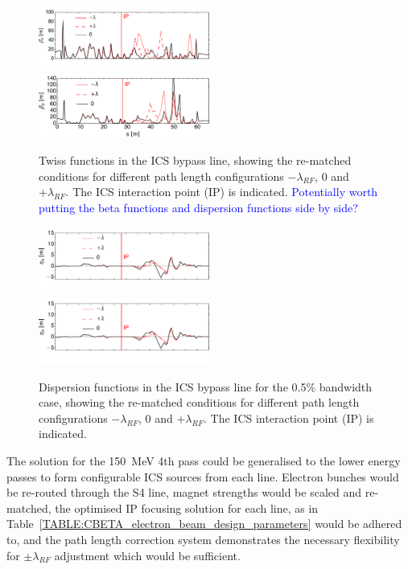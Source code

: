 \documentclass[../main.tex]{subfiles}
\begin{document}
\begin{figure}[!h]
    \centering
    \includegraphics[width=0.5\textwidth]{Figures/CBETA_Inverse_Compton_Source_Design/twissplotx.pdf}
    \includegraphics[width=0.5\textwidth]{Figures/CBETA_Inverse_Compton_Source_Design/twissploty.pdf}
    \caption{Twiss functions in the ICS bypass line, showing the re-matched conditions for different path length configurations $-\lambda_{RF}$, $0$ and $+\lambda_{RF}$. The ICS interaction point (IP) is indicated. \textcolor{blue}{Potentially worth putting the beta functions and dispersion functions side by side?}}
    \label{fig:CBETA_ICS_Twiss}
\end{figure}

\begin{figure}[!h]
\centering
\includegraphics[width=0.5\textwidth]{Figures/CBETA_Inverse_Compton_Source_Design/dispplotx.pdf}
\includegraphics[width=0.5\textwidth]{Figures/CBETA_Inverse_Compton_Source_Design/dispplotx.pdf}
\caption{Dispersion functions in the ICS bypass line for the 0.5\% bandwidth case, showing the re-matched conditions for different path length configurations $-\lambda_{RF}$, $0$ and $+\lambda_{RF}$. The ICS interaction point (IP) is indicated.}
\label{fig:CBETA_ICS_dispersion}
\end{figure}

The solution for the 150~\si{\mega\electronvolt} 4th pass could be generalised to the lower energy passes to form configurable ICS sources from each line. Electron bunches would be re-routed through the S4 line, magnet strengths would be scaled and re-matched, the optimised IP focusing solution for each line, as in Table~\ref{TABLE:CBETA_electron_beam_design_parameters} would be adhered to, and the path length correction system demonstrates the necessary flexibility for $\pm\lambda_{RF}$ adjustment which would be sufficient.
\end{document}
